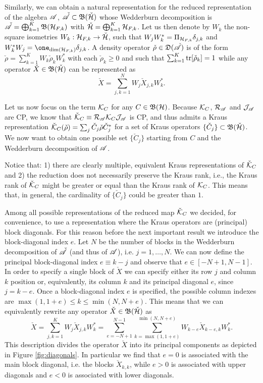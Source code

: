 \documentclass[aihp,12pt]{imsart}
\begin{document}
Similarly, we can obtain a natural representation for the reduced representation of the algebra $\mathscr{A}$, $\check{\mathscr{A}}\subset\mathfrak{B}(\check{\mathcal{H}})$ whose Wedderburn decomposition is $\check{\mathscr{A}} = \bigoplus_{k=1}^K \mathfrak{B}(\mathcal{H}_{F,k})$ with $\check{\mathcal{H}} = \bigoplus_{k=1}^K \mathcal{H}_{F,k}$. Let us then denote by $W_k$ the non-square isometries $W_k:\mathcal{H}_{F,k}\to\check{\mathcal{H}}$, such that $W_j W_k^* = \Pi_{\mathcal{H}_{F,k}}\delta_{j,k}$ and $W_k^* W_j = \one_{\dim(\Hc_{F,k})}\delta_{j,k}$. A density operator $\check{\rho}\in\mathfrak{D}(\check{\mathscr{A}})$ is of the form $\check{\rho} = \sum_{k=1}^K W_k \check{\rho}_k W_k^*$ with each $\check{\rho}_k\geq0$ and such that $\sum_{k=1}^K{\rm tr}[\check{\rho}_k] = 1$ while any operator $\check{X}\in\mathfrak{B}(\check{\mathcal{H}})$ can be represented as \[\check{X} = \sum_{j,k=1}^{N} W_j \check{X}_{j,k} W_k^*.\]

Let us now focus on the term $\mathcal{K}_{C}$ for any $C\in\mathfrak{B}(\mathcal{H})$.
Because $\mathcal{K}_C$, $\mathcal{R}_{\mathscr{A}}$ and $\mathcal{J}_{\mathscr{A}}$ are CP, we know that $\check{\mathcal{K}}_{C}\equiv \mathcal{R}_{\mathscr{A}} \mathcal{K}_C \mathcal{J}_{\mathscr{A}}$ is CP, and thus admits a Kraus representation $\check{\mathcal{K}}_C(\check{\rho}) = \sum_j \check{C}_j \check{\rho} \check{C}_j^*$ for a set of Kraus operators $\{\check{C}_j\}\subset\mathfrak{B}(\check{\mathcal{H}})$. We now want to obtain one possible set $\{\check{C}_j\}$ starting from $C$ and the Wedderburn decomposition of $\mathscr{A}$.  

 Notice that: 1) there are clearly multiple, equivalent Kraus representations of $\check{\mathcal{K}}_C$ and 2) the reduction does not necessarily preserve the Kraus rank, i.e., the Kraus rank of $\check{\mathcal{K}}_C$ might be greater or equal than the Kraus rank of $\mathcal{K}_C$. This means that, in general, the cardinality of $\{\check{C}_j\}$ could be greater than $1$. 

Among all possible representations of the reduced map $\check{\mathcal{K}}_C$ we decided, for convenience, to use a representation where the Kraus operators are (principal) block diagonals. For this reason before the next important result we introduce the block-diagonal index $e$. Let $N$ be the number of blocks in the Wedderburn decomposition of $\check{\mathscr{A}}$ (and thus of $\mathscr{A}$), i.e. $j=1,\dots,N$. 
We can now define the principal block-diagonal index $e\equiv k-j$ and observe that $e\in[-N+1,N-1]$. 
In order to specify a single block of $\check{X}$ we can specify either its row $j$ and column $k$ position or, equivalently, its column $k$ and its principal diagonal $e$, since $j=k-e$. Once a block-diagonal index $e$ is specified, the possible column indexes are $\max(1,1+e)\leq k\leq\min(N,N+e)$.  
This means that we can equivalently rewrite any operator $\check{X}\in\mathfrak{B}(\check{\mathcal{H}})$ as
\[\check{X} = \sum_{j,k=1}^K W_j \check{X}_{j,k} W_k^* = \sum_{e=-N+1}^{N-1} \sum_{k=\max(1,1+e)}^{\min(N,N+e)} W_{k-e} \check{X}_{k-e,k} W_{k}^*.\]
This description divides the operator $\check{X}$ into its principal components as depicted in Figure \ref{fig:diagonals}. In particular we find that $e=0$ is associated with the main block diagonal, i.e. the blocks $\check{X}_{k,k}$, while $e>0$ is associated with upper diagonals and $e<0$ is associated with lower diagonals.
\end{document}

